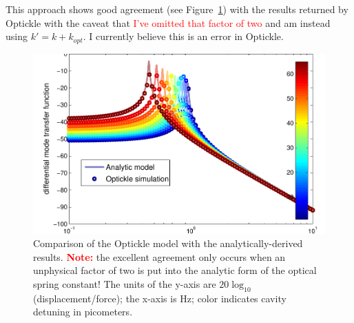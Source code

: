 This approach shows good agreement (see Figure~\ref{fig:model-comparison})
with the results returned by Optickle with the caveat that \textcolor{red}{I've
omitted that factor of two} and am instead using $k'=k+k_{opt}$.
I currently believe this is an error in Optickle.

\begin{figure}[H]
\includegraphics{figures/model-comparison}

\caption{\label{fig:model-comparison}Comparison of the Optickle model with
the analytically-derived results. \textbf{\textcolor{red}{Note:}}
the excellent agreement only occurs when an unphysical factor of two
is put into the analytic form of the optical spring constant! The
units of the y-axis are $20\log_{10}$(displacement/force); the x-axis
is Hz; color indicates cavity detuning in picometers.}
\end{figure}
